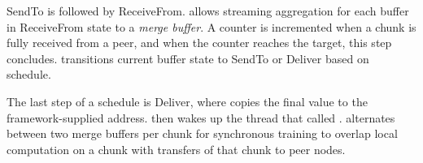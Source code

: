 SendTo is followed by ReceiveFrom. \ha allows streaming aggregation for each buffer in ReceiveFrom state to a \textit{merge buffer}. A counter is incremented when a chunk is fully received from a peer, and when the counter reaches the target, this step concludes. \ha transitions current buffer state to SendTo or Deliver based on schedule. 


The last step of a schedule is Deliver, where \ha copies the final value to the framework-supplied address. \ha then wakes up the thread that called . \ha alternates between two merge buffers per chunk for synchronous training to overlap local computation on a chunk with transfers of that chunk to peer nodes.




